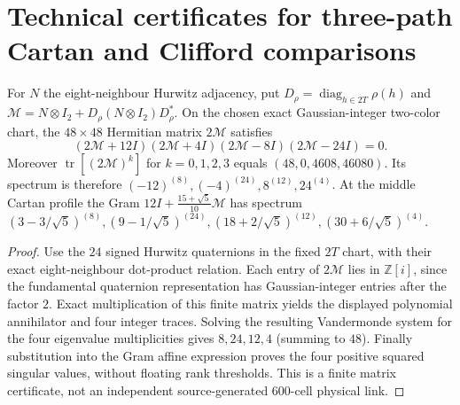 \documentclass[12pt,a4paper]{article}
\begin{document}
\section{Technical certificates for three-path Cartan and Clifford comparisons}
\label{p13:sec:v3027-three-path-certificates}
\begin{proposition}
\label{p13:prop:v3027-cartan-gaussian-spectrum}
For $N$ the eight-neighbour Hurwitz adjacency, put
$D_\rho=\operatorname{diag}_{h\in2T}\rho(h)$ and
$\mathscr M=N\otimes I_2+D_\rho(N\otimes I_2)D_\rho^*$.
On the chosen exact Gaussian-integer two-color chart, the
$48\times48$ Hermitian matrix $2\mathscr M$ satisfies
\[
\boxed{(2\mathscr M+12I)(2\mathscr M+4I)
(2\mathscr M-8I)(2\mathscr M-24I)=0.}
\]
Moreover $\operatorname{tr}[(2\mathscr M)^k]$ for
$k=0,1,2,3$ equals $(48,0,4608,46080)$.
Its spectrum is therefore
$(-12)^{(8)},(-4)^{(24)},8^{(12)},24^{(4)}$.
At the middle Cartan profile the Gram
$12I+\frac{15+\sqrt5}{10}\mathscr M$
has spectrum
$(3-3/\sqrt5)^{(8)},(9-1/\sqrt5)^{(24)},
(18+2/\sqrt5)^{(12)},(30+6/\sqrt5)^{(4)}$.
\end{proposition}
\begin{proof}
Use the $24$ signed Hurwitz quaternions in the fixed $2T$ chart,
with their exact eight-neighbour dot-product relation.
Each entry of $2\mathscr M$ lies in $\mathbb Z[i]$, since the
fundamental quaternion representation has Gaussian-integer
entries after the factor $2$. Exact multiplication of this finite
matrix yields the displayed polynomial annihilator and four
integer traces. Solving the resulting Vandermonde system for the
four eigenvalue multiplicities gives $8,24,12,4$ (summing to $48$).
Finally substitution into the Gram affine expression proves the
four positive squared singular values, without floating rank
thresholds. This is a finite matrix certificate, not an independent
source-generated $600$-cell physical link.
\end{proof}
\end{document}

